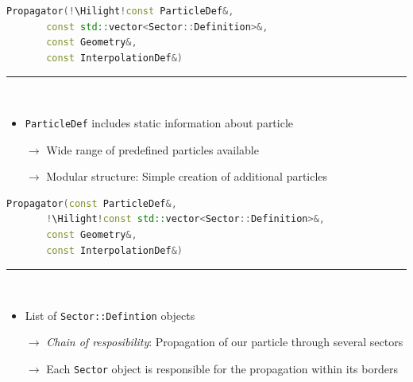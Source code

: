 \documentclass[aspectratio=1610, captions=tableheading, 11pt]{beamer}
\newcommand{\Hilight}{\makebox[0pt][l]{\color{tugreen}\rule[-4pt]{0.65\linewidth}{14pt}}}
\begin{document}
\begin{frame}[fragile]
\begin{lstlisting}[language=C++,basicstyle=\ttfamily,keywordstyle=\color{red}, escapechar=\!]
Propagator(!\Hilight!const ParticleDef&,
	   const std::vector<Sector::Definition>&,
	   const Geometry&,
	   const InterpolationDef&)
\end{lstlisting}
	\textcolor{tugreen}{\rule{\textwidth}{1pt}}\\%
    \begin{itemize}
      \setlength\itemsep{0.5em}
      \item \texttt{ParticleDef} includes static information about particle
      \item [$\rightarrow$] Wide range of predefined particles available 
      \item [$\rightarrow$] Modular structure: Simple creation of additional particles
    \end{itemize}
\end{frame}


\begin{frame}[fragile]
\begin{lstlisting}[language=C++,basicstyle=\ttfamily,keywordstyle=\color{red}, escapechar=\!]
Propagator(const ParticleDef&,
	   !\Hilight!const std::vector<Sector::Definition>&,
	   const Geometry&,
	   const InterpolationDef&)
\end{lstlisting}
	\textcolor{tugreen}{\rule{\textwidth}{1pt}}\\%
    \begin{itemize}
      \setlength\itemsep{0.5em}
      \item List of \texttt{Sector::Defintion} objects
      \item [$\rightarrow$] \emph{Chain of resposibility}: Propagation of our particle through several sectors
      \item [$\rightarrow$] Each \texttt{Sector} object is responsible for the propagation within its borders
    \end{itemize}
\end{frame}
\end{document}
